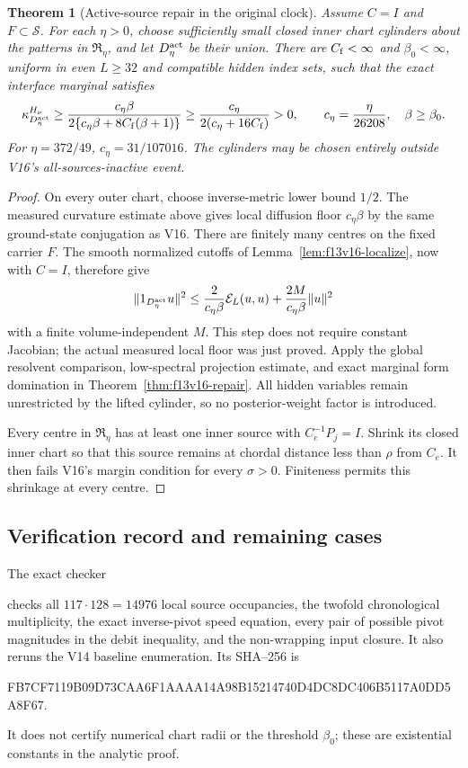 \documentclass[11pt,oneside]{article}
\newtheorem{theorem}{Theorem}[section]
\begin{document}
\begin{theorem}[Active-source repair in the original clock]
\label{thm:f13v17-repair}
Assume \(C=I\) and \(F\subset\mathcal S\).
For each \(\eta>0\), choose sufficiently small
closed inner chart cylinders about the patterns
in \(\mathfrak R_\eta\), and let \(D_\eta^{\rm act}\)
be their union. There are \(C_{\rm f}<\infty\) and
\(\beta_0<\infty\), uniform in even \(L\ge32\)
and compatible hidden index sets, such that
the exact interface marginal satisfies
\[
 \kappa_{D_\eta^{\rm act}}^{H_\nu}
 \ge\frac{c_\eta\beta}
           {2\{c_\eta\beta+8C_{\rm f}(\beta+1)\}}
 \ge\frac{c_\eta}{2(c_\eta+16C_{\rm f})}>0,
 \qquad c_\eta=\frac{\eta}{26208},\quad\beta\ge\beta_0.
\]
For \(\eta=372/49\), \(c_\eta=31/107016\).
The cylinders may be chosen entirely outside
V16's all-sources-inactive event.
\end{theorem}

\begin{proof}
On every outer chart, choose inverse-metric lower
bound \(1/2\). The measured curvature estimate
above gives local diffusion floor \(c_\eta\beta\)
by the same ground-state conjugation as V16.
There are finitely many centres on the fixed
carrier \(F\). The smooth normalized cutoffs of
Lemma~\ref{lem:f13v16-localize}, now with \(C=I\),
therefore give
\[
 \|1_{D_\eta^{\rm act}}u\|^2
       \le\frac{2}{c_\eta\beta}\mathcal E_L(u,u)
               +\frac{2M}{c_\eta\beta}\|u\|^2
\]
with a finite volume-independent \(M\).
This step does not require constant Jacobian;
the actual measured local floor was just proved.
Apply the global resolvent comparison, low-spectral
projection estimate, and exact marginal form
domination in Theorem~\ref{thm:f13v16-repair}.
All hidden variables remain unrestricted by the
lifted cylinder, so no posterior-weight factor
is introduced.

Every centre in \(\mathfrak R_\eta\) has at least
one inner source with \(C_e^{-1}P_j=I\).
Shrink its closed inner chart so that this
source remains at chordal distance less than
\(\rho\) from \(C_e\). It then fails V16's
margin condition for every \(\sigma>0\).
Finiteness permits this shrinkage at every centre.
\end{proof}

\subsection{Verification record and remaining cases}

The exact checker
\begin{center}\small
{}
\end{center}
checks all \(117\cdot128=14976\) local source
occupancies, the twofold chronological multiplicity,
the exact inverse-pivot speed equation, every pair
of possible pivot magnitudes in the debit inequality,
and the non-wrapping input closure. It also reruns
the V14 baseline enumeration. Its SHA--256 is
\begin{center}\scriptsize\ttfamily
FB7CF7119B09D73CAA6F1AAAA14A98B15214740D4DC8DC406B5117A0DD5A8F67.
\end{center}
It does not certify numerical chart radii or
the threshold \(\beta_0\); these are existential
constants in the analytic proof.
\end{document}
